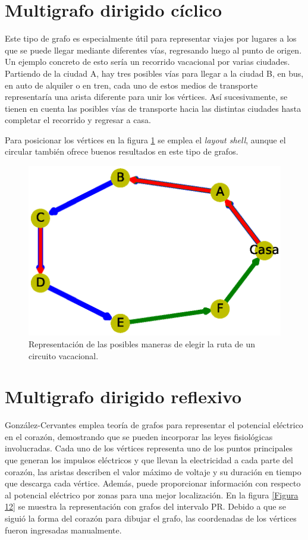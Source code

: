 \documentclass{article}
\begin{document}



\section{Multigrafo dirigido cíclico}

Este tipo de grafo es especialmente útil para representar viajes por lugares a los que se puede llegar mediante diferentes vías, regresando luego al punto de origen. Un ejemplo concreto de esto sería un recorrido vacacional por varias ciudades. Partiendo de la ciudad A, hay tres posibles vías  para llegar a la ciudad B, en bus, en auto de alquiler o en tren, cada uno de estos medios de transporte representaría una arista diferente para unir los vértices. Así sucesivamente, se tienen en cuenta las posibles vías de transporte hacia las distintas ciudades hasta completar el recorrido y regresar a casa. 

Para posicionar los vértices en la figura \ref{Figura 11} se emplea el \textit{layout shell}, aunque el circular también ofrece buenos resultados en este tipo de grafos.


\begin{figure}
\begin{center}
  \includegraphics[width=.6\columnwidth]{fig11.eps}
  \vspace*{-15mm}
  \caption{Representación de las posibles maneras de elegir la ruta de un circuito vacacional.}
  \end{center}
  \label{Figura 11}
\end{figure}




\section{Multigrafo dirigido reflexivo}

González-Cervantes \cite{gonzalez2016potencial} emplea teoría de grafos para representar el potencial eléctrico en el corazón, demostrando que se pueden incorporar las leyes fisiológicas involucradas. Cada uno de los vértices representa uno de los puntos principales que generan los impulsos eléctricos y que llevan la electricidad a cada parte del corazón, las aristas describen el valor máximo de voltaje y su
duración en tiempo que descarga cada vértice. Además, puede proporcionar información con respecto al potencial eléctrico por zonas para una mejor localización.
En la figura \ref{Figura 12} se muestra la representación con grafos del intervalo PR. Debido a que se siguió la forma del corazón para dibujar el grafo, las coordenadas de los vértices fueron ingresadas manualmente.
\end{document}
